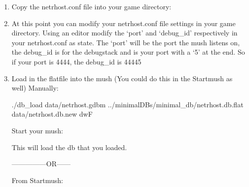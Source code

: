 \documentclass[letterpaper,10pt,english]{sphinxmanual}
\begin{document}
\begin{sphinxVerbatim}[commandchars=\\\{\}]
  
\end{sphinxVerbatim}
\begin{enumerate}
%
\setcounter{enumi}{1}
\item {} 
\sphinxAtStartPar
Copy the netrhost.conf file into your game directory:

\begin{sphinxVerbatim}[commandchars=\\\{\}]
   
\end{sphinxVerbatim}

\item {} 
\sphinxAtStartPar
At this point you can modify your netrhost.conf file settings in your game directory.
Using an editor modify the ‘port’ and ‘debug\_id’ respectively in your netrhost.conf as state.
The ‘port’ will be the port the mush listens on, the debug\_id is for the debug\sphinxhyphen{}stack and is
your port with a ‘5’ at the end.  So if your port is 4444, the debug\_id is 44445

\item {} 
\sphinxAtStartPar
Load in the flatfile into the mush (You could do this in the Startmush as well)
Manually:

\begin{sphinxVerbatim}[commandchars=\\\{\}]
 
\end{sphinxVerbatim}

\sphinxAtStartPar
./db\_load data/netrhost.gdbm ../minimal\sphinxhyphen{}DBs/minimal\_db/netrhost.db.flat data/netrhost.db.new dwF

\sphinxAtStartPar
Start your mush:

\begin{sphinxVerbatim}[commandchars=\\\{\}]
\end{sphinxVerbatim}

\sphinxAtStartPar
This will load the db that you loaded.

\sphinxAtStartPar
—————OR——\sphinxhyphen{}

\sphinxAtStartPar
From Startmush:

\begin{sphinxVerbatim}[commandchars=\\\{\}]
 
\end{sphinxVerbatim}

\end{enumerate}
\end{document}
